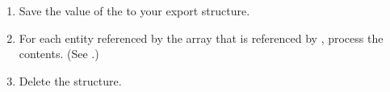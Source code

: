 \documentclass[letterpaper,12pt,english,openany,oneside]{sphinxmanual}
\begin{document}
\begin{sphinxVerbatim}[commandchars=\\\{\}]
    
\end{sphinxVerbatim}
\begin{enumerate}
%
\setcounter{enumi}{2}
\item {} 
Save the value of the  to your export structure.

\item {} 
For each  entity referenced by the array that is referenced by , process the contents. (See .)

\item {} 
Delete the  structure.

\end{enumerate}

\begin{sphinxVerbatim}[commandchars=\\\{\}]
 
\end{sphinxVerbatim}
\end{document}

